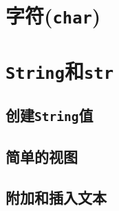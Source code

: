 \section{字符(\texttt{char})}

\section{\texttt{String}和\texttt{str}}

\subsection{创建\texttt{String}值}

\subsection{简单的视图}

\subsection{附加和插入文本}\label{AppendText}